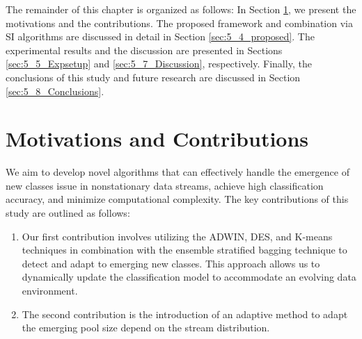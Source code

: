   
  The remainder of this chapter is organized as follows: In Section \ref{sec:5_2_motivation}, we present the motivations and the contributions. The proposed framework and combination via SI algorithms are discussed in detail in Section \ref{sec:5_4_proposed}. The  experimental results and the discussion are presented in Sections \ref{sec:5_5_Expsetup} and \ref{sec:5_7_Discussion}, respectively. Finally, the conclusions of this study and future research are discussed in Section \ref{sec:5_8_Conclusions}. 
  
  
  \section{Motivations and Contributions} \label{sec:5_2_motivation}
  We aim to develop novel algorithms that can effectively handle the emergence of new classes issue in nonstationary data streams, achieve high classification accuracy, and minimize computational complexity. The key contributions of this study are outlined as follows:
   
  \begin{enumerate}[nosep]
    \item Our first contribution involves utilizing the ADWIN, DES, and K-means techniques in combination with the ensemble stratified bagging technique to detect and adapt to emerging new classes. This approach allows us to dynamically update the classification model to accommodate an evolving data environment.
   \item The second contribution is the introduction of an adaptive method to adapt the emerging pool size depend on the stream distribution.
    \end{enumerate} 
   
     
  
  
 
   


